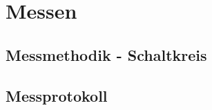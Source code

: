 
\chapter{Messen}\label{sec:Messen}


\section{Messmethodik - Schaltkreis}\label{sec:Messmethodik_Schaltkreis}


\section{Messprotokoll}\label{sec:Messprotokoll}






